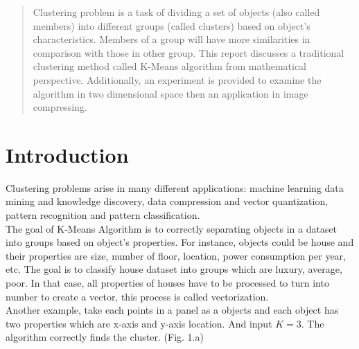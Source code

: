 \documentclass[conference]{IEEEtran}
\begin{document}
\maketitle

\begin{abstract}
Clustering problem is a task of dividing a set of objects (also called members) into different groups (called clusters) based on object's characteristics. Members of a group will have more similarities in comparison with those in other group. This report discusses a traditional clustering method called K-Means algorithm from mathematical perspective. Additionally, an experiment is provided to examine the algorithm in two dimensional space then an application in image compressing.
\end{abstract}





%
\IEEEpeerreviewmaketitle


\section{Introduction}
Clustering problems arise in many different applications: machine learning data mining and knowledge discovery, data compression and vector quantization, pattern recognition and pattern classification.~\cite{1}\\
\indent The goal of K-Means Algorithm is to correctly separating objects in a dataset into groups based on object's properties. For instance, objects could be house and their properties are size, number of floor, location, power consumption per year, etc. The goal is to classify house dataset into groups which are luxury, average, poor. In that case, all properties of houses have to be processed to turn into number to create a vector, this process is called vectorization.\\
\indent Another example, take each points in a panel as a objects and each object has two properties which are x-axis and y-axis location. And input $K=3$. The algorithm correctly finds the cluster. (Fig. 1.a)
\end{document}
